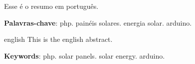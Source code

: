 
\setlength{\absparsep}{18pt} %
\begin{resumo}
	Esse é o resumo em português.

 \textbf{Palavras-chave}: php. painéis solares. energia solar. arduino.
\end{resumo}

\begin{resumo}[Abstract]
 \begin{otherlanguage*}{english}
   This is the english abstract.

   \vspace{\onelineskip}

   \noindent
   \textbf{Keywords}: php. solar panels. solar energy. arduino.
 \end{otherlanguage*}
\end{resumo}
